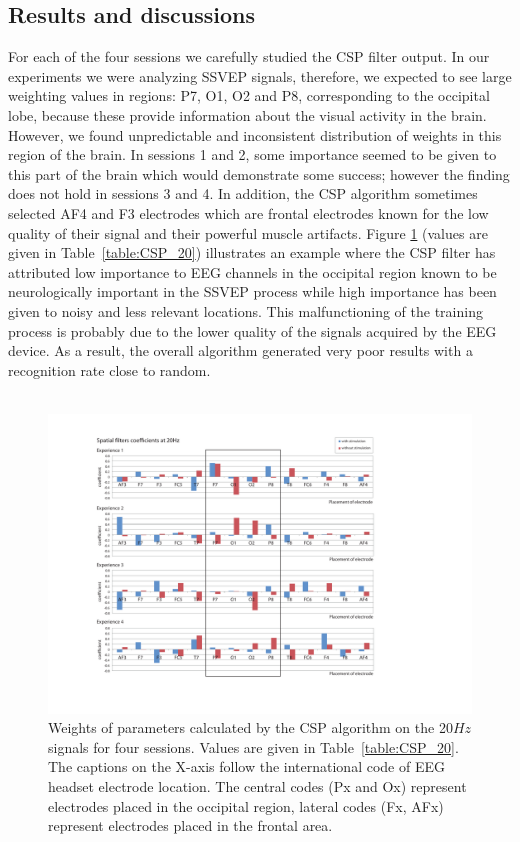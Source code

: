 \documentclass[smallextended]{svjour3}
\begin{document}
\subsection{Results and discussions}
For each of the four sessions we carefully studied the CSP filter output. In our experiments we were analyzing SSVEP signals, therefore, we expected to see large weighting values in regions: P7, O1, O2 and P8, corresponding to the occipital lobe, because these provide information about the visual activity in the brain. However, we found unpredictable and inconsistent distribution of weights in this region of the brain. In sessions 1 and 2, some importance seemed to be given to this part of the brain which would demonstrate some success; however the finding does not hold in sessions 3 and 4. In addition, the CSP algorithm sometimes selected AF4 and F3 electrodes which are frontal electrodes known for the low quality of their signal and their powerful muscle artifacts. Figure \ref{fig:CSP_20} (values are given in Table~\ref{table:CSP_20}) illustrates an example where the CSP filter has attributed low importance to EEG channels in the occipital region known to be neurologically important in the SSVEP process while high importance has been given to noisy and less relevant locations. This malfunctioning of the training process is probably due to the lower quality of the signals acquired by the EEG device. As a result, the overall algorithm generated very poor results with a recognition rate close to random.\\
\\
\begin{figure}
\center
\includegraphics[width = \textwidth] {figures/CSP-20Hz-all.pdf}
\caption{Weights of parameters calculated by the CSP algorithm on the 20$Hz$ signals for four sessions. Values are given in Table~\ref{table:CSP_20}. The captions on the X-axis follow the international code of EEG headset electrode location. The central codes (Px and Ox) represent electrodes placed in the occipital region, lateral codes (Fx, AFx) represent electrodes placed in the frontal area.} \label{fig:CSP_20}
\end{figure}
\end{document}

